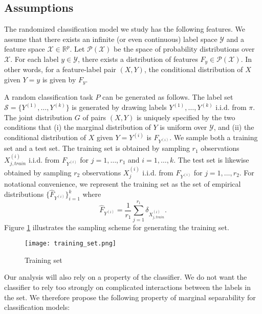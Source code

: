 \documentclass[12pt]{article}
\begin{document}
\subsection{Assumptions}

The randomized classification model we study has the following
features.  We assume that there exists an infinite (or even
continuous) label space $\mathcal{Y}$ and a feature space
$\mathcal{X} \in \mathbb{R}^p$.  Let $\mathcal{P}(\mathcal{X})$ be the space of probability distributions over $\mathcal{X}$. For each label $y \in \mathcal{Y}$,
there exists a distribution of features $F_y \in \mathcal{P}(\mathcal{X})$. In other words, for a feature-label pair $(X, Y)$, the conditional distribution
of $X$ given $Y = y$ is given by $F_y$.  

A random classification task $P$ can be generated as follows.  The
label set $\mathcal{S} = \{Y^{(1)},\hdots, Y^{(k)}\}$ is generated by
drawing labels $Y^{(1)},\hdots, Y^{(k)}$ i.i.d. from $\pi$.  The joint
distribution $G$ of pairs $(X, Y)$ is uniquely specified by the two
conditions that (i) the marginal distribution of $Y$ is uniform over
$\mathcal{Y}$, and (ii) the conditional distribution of $X$ given
$Y=Y^{(i)}$ is $F_{Y^{(i)}}$.  We sample both a training set and a
test set.  The training set is obtained by sampling $r_1$ observations
$X_{j, train}^{(i)}$ i.i.d. from $F_{Y^{(i)}}$ for $j = 1,\hdots,
r_1$ and $i = 1,\hdots, k$.  The test set is likewise obtained by sampling $r_2$
observations $X_j^{(i)}$ i.i.d. from $F_{Y^{(i)}}$ for $j = 1,\hdots,
r_2$.  For notational convenience, we represent the training set as
the set of empirical distributions $\{\hat{F}_{Y^{(i)}}\}_{i=1}^k$
where
\[
\hat{F}_{Y^{(i)}} = \frac{1}{r_1} \sum_{j=1}^{r_1} \delta_{X^{(i)}_{j, train}}.
\]
Figure \ref{fig:training_set} illustrates the sampling scheme for
generating the training set.

\begin{figure}[h]
\centering
\texttt{[image: training\_set.png]}
\caption{Training set}\label{fig:training_set}
\end{figure}

Our analysis will also rely on a property of the classifier. We do not
want the classifier to rely too strongly on complicated interactions
between the labels in the set. We therefore propose the following
property of marginal separability for classification models:
\end{document}
